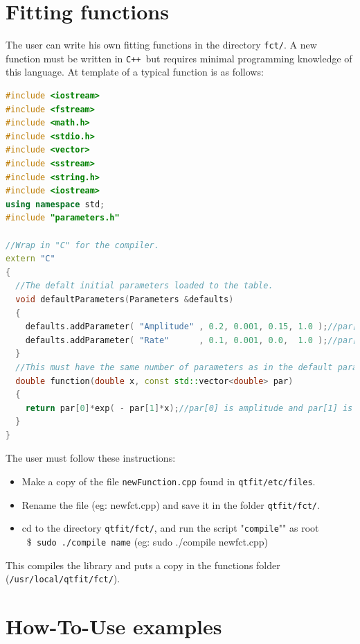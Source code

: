 \documentclass[10pt,letterpaper,oneside]{article}
\newcommand{\cpp}{\texttt{C++}}
\begin{document}
\section{Fitting functions}
The user can write his own fitting functions in the directory \verb+fct/+.
A new function must be written in \cpp\ but requires minimal programming knowledge of this language. 
At template of a typical function is as follows:
\begin{lstlisting}[language=C++, keywordstyle=\color{red}]
#include <iostream>
#include <fstream> 
#include <math.h>
#include <stdio.h>
#include <vector>
#include <sstream>   
#include <string.h>
#include <iostream>
using namespace std;
#include "parameters.h"

//Wrap in "C" for the compiler.
extern "C" 
{ 
  //The defalt initial parameters loaded to the table.
  void defaultParameters(Parameters &defaults)
  {
    defaults.addParameter( "Amplitude" , 0.2, 0.001, 0.15, 1.0 );//par[0]
    defaults.addParameter( "Rate"      , 0.1, 0.001, 0.0,  1.0 );//par[1]
  }
  //This must have the same number of parameters as in the default parameters above.
  double function(double x, const std::vector<double> par)
  {
  	return par[0]*exp( - par[1]*x);//par[0] is amplitude and par[1] is rate.
  }
}
\end{lstlisting}
The user must follow these instructions:
\begin{itemize}
\item Make a copy of the file \verb+newFunction.cpp+ found in \verb+qtfit/etc/files+.
\item Rename the file (eg: newfct.cpp) and save it in the folder \verb+qtfit/fct/+.
\item cd to the directory \verb+qtfit/fct/+, and run the script "\verb+compile+"" as root\\\
 \texttt{$\$$ sudo ./compile name}   (eg: sudo ./compile newfct.cpp)
 \end{itemize}
This compiles the library and puts a copy in the functions folder (\verb+/usr/local/qtfit/fct/+).



\newpage
\section{How-To-Use examples}
\end{document}
